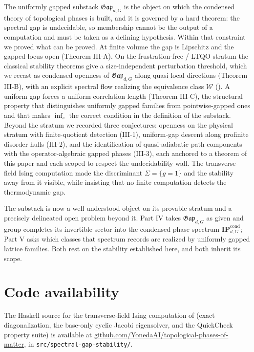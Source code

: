\documentclass[12pt]{article}
\newcommand{\Gap}{\mathfrak{Gap}}              %
\newcommand{\Weq}{\mathcal{W}}                 %
\newcommand{\IPcond}{\mathbf{IP}^{\mathrm{cond}}}  %
\newcommand{\Sig}{\Sigma}                       %
\DeclareMathOperator*{\einf}{inf}
\theoremstyle{plain}
\theoremstyle{definition}
\theoremstyle{remark}
\begin{document}
The uniformly gapped substack $\Gap_{d,G}$ is the object on which the condensed theory
of topological phases is built, and it is governed by a hard theorem: the spectral gap
is undecidable, so membership cannot be the output of a computation and must be taken
as a defining hypothesis. Within that constraint we proved what can be proved. At
finite volume the gap is Lipschitz and the gapped locus open (Theorem III-A)\@. On the
frustration-free / LTQO stratum the classical stability theorems give a
size-independent perturbation threshold, which we recast as condensed-openness of
$\Gap_{d,G}$ along quasi-local directions (Theorem III-B), with an explicit spectral
flow realizing the equivalence class $\Weq$ (). A uniform gap forces a
uniform correlation length (Theorem III-C), the structural property that distinguishes
uniformly gapped families from pointwise-gapped ones and that makes $\einf_s$ the
correct condition in the definition of the substack. Beyond the stratum we recorded
three conjectures: openness on the physical stratum with finite-quotient detection
(III-1), uniform-gap descent along profinite disorder hulls (III-2), and the
identification of quasi-adiabatic path components with the operator-algebraic gapped
phases (III-3), each anchored to a theorem of this paper and each scoped to respect the
undecidability wall. The transverse-field Ising computation made the discriminant
$\Sig=\{g=1\}$ and the stability away from it visible, while insisting that no finite
computation detects the thermodynamic gap.

The substack is now a well-understood object on its provable stratum and a precisely
delineated open problem beyond it. Part IV takes $\Gap_{d,G}$ as given and
group-completes its invertible sector into the condensed phase spectrum
$\IPcond_{d,G}$; Part V asks which classes that spectrum records are realized by
uniformly gapped lattice families. Both rest on the stability established here, and
both inherit its scope.

\section*{Code availability}
The Haskell source for the transverse-field Ising computation of 
(exact diagonalization, the base-only cyclic Jacobi eigensolver, and the QuickCheck
property suite) is available at
\href{https://github.com/YonedaAI/topological-phases-of-matter}{github.com/YonedaAI/topological-phases-of-matter},
in \texttt{src/spectral-gap-stability/}.



\end{document}
